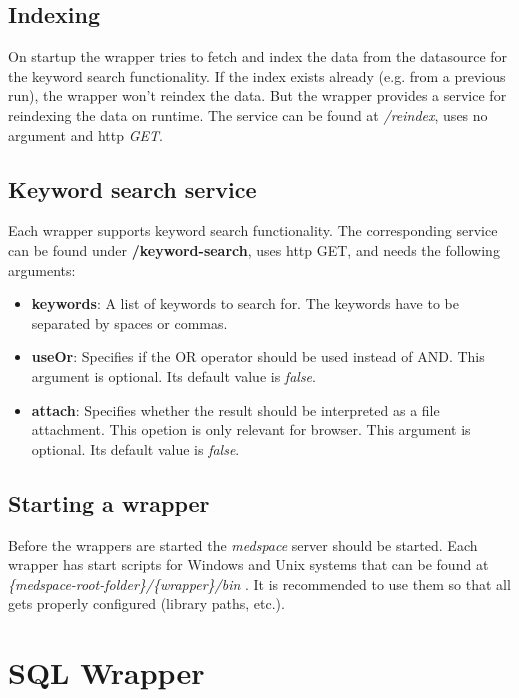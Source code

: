 \subsection{Indexing}

On startup the wrapper tries to fetch and index the data from the datasource for the keyword search functionality. If the index exists already (e.g. from a previous run), the wrapper won't reindex the data. But the wrapper provides a service for reindexing the data on runtime. The service can be found at \emph{/reindex}, uses no argument and http \emph{GET}.

\subsection{Keyword search service}

Each wrapper supports keyword search functionality. The corresponding service can be found under 
\textbf{/keyword-search}, uses http GET, and needs the following arguments:
\begin{itemize}
\item \textbf{keywords}: A list of keywords to search for. The keywords have to be separated by spaces or commas.
\item \textbf{useOr}: Specifies if the OR operator should be used instead of AND. This argument is optional. Its default value is \emph{false}.
\item \textbf{attach}: Specifies whether the result should be interpreted as a file attachment. This opetion is only relevant for browser. This argument is optional. Its default value is \emph{false}.
\end{itemize}

\subsection{Starting a wrapper}

Before the wrappers are started the \emph{medspace} server should be started.
Each wrapper has start scripts for Windows and Unix systems that can be found at \\
\emph{\{medspace-root-folder\}/\{wrapper\}/bin }. It is recommended to use them so that all gets properly configured (library paths, etc.).


\section{SQL Wrapper}

